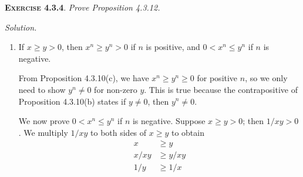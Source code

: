 \documentclass[12pt]{article}
\theoremstyle{remark}
\newenvironment{exer}[2]{
    \noindent \setlength{\parskip}{1em}%
    \textsc{\textbf{Exercise #1}}. \textit{#2} \par
    \noindent \textit{Solution.} %
}{\bigskip}
\begin{document}
\begin{exer}{4.3.4}{
    Prove Proposition 4.3.12.
}
\begin{enumerate}[topsep=0mm,label=(\alph*)]
\begin{enumerate}[topsep=0mm,label=(\roman*)]
                We first introduce a lemma: $(1/x^a)^b = x^{-ab}$ for positive $a, b$. We have
                \[
                    (1/x^a)^b (x^a)^b = (x^a / x^a)^b = 1^a = 1,
                \]
                then
                \[
                    (1/x^a)^b = 1/(x^a)^b = 1/x^{ab} = x^{-ab},
                \]
                hence proven.
                
                We will split into cases.
                If $m \ge 0$, $n \ge 0$, then this is the case in Exercise 4.3.3.
                If $m < 0$, $n \ge 0$, then
                \[
                    (x^n)^m = (x^n)^{-p} = (1/x^n)^p = x^{-np} = x^{n(-p)} = x^{mn}.
                \]
                For the case $m \ge 0$, $n < 0$, we have
                \[
                    (x^n)^m = (x^{-q})^m = (1/x^q)^m = x^{-qm} = x^{nm}.
                \]
                If $m, n < 0$, then
                \[
                    (x^n)^m = (x^{-q})^{-p} = 1 / (x^{-q})^p = 1 / x^{-pq} = x^pq = x^{(-m)(-n)} = x^{mn}.
                \]
            
            \item $(xy)^n = x^n y^n$.

                We will only prove the case of $n < 0$ as we have proven this statement for $n \ge 0$ in Exercise 4.3.3.
                \[
                    (xy)^n = 1/(xy)^q = 1/(x^q y^q) = 1/x^q \times 1/y^q = x^{-q} y^{-q} = x^n y^n.
                \]
            \end{enumerate}
        
        \item If $x \ge y > 0$, then $x^n \ge y^n > 0$ if $n$ is positive, and $0 < x^n \le y^n$ if $n$ is negative.

            From Proposition 4.3.10(c), we have $x^n \ge y^n \ge 0$ for positive $n$, so we only need to show $y^n \ne 0$ for non-zero $y$.
            This is true because the contrapositive of Proposition 4.3.10(b) states if $y \ne 0$, then $y^n \ne 0$.

            We now prove $0 < x^n \le y^n$ if $n$ is negative.
            Suppose $x \ge y > 0$; then $1/xy > 0$.
            We multiply $1/xy$ to both sides of $x \ge y$ to obtain
            \begin{align*}
                x &\ge y \\
                x/xy &\ge y/xy \\
                1/y &\ge 1/x
            \end{align*}


\end{enumerate}
\end{exer}
\end{document}
